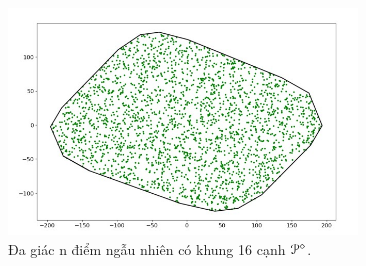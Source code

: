 \documentclass[12pt,a4paper,openany,oneside]{report}
\begin{document}
\begin{figure}[ht!]
	\begin{center}
		\includegraphics[width=350px]{./frame_polygon.jpg}
		\caption{Đa giác n điểm ngẫu nhiên có khung 16 cạnh ${\cal P}^\diamond$.}
		\label{frame_polygon}
	\end{center}
\end{figure} 	
\end{document}
